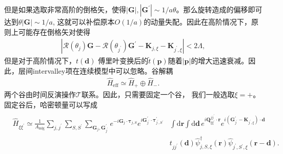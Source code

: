 \documentclass[10pt, oneside]{article}
\begin{document}
但是如果选取非常高阶的倒格矢，使得\(\left|\bm{G}\right|, \left|\bm{G}^{\prime}\right| \sim 1/a \theta\)。那么旋转造成的偏移即可达到\(\theta \left|\bm{G}\right| \sim 1/a\), 这就可以补偿原本\(O \left(1/a\right)\)的动量失配。因此在高阶情况下，原则上可能存在倒格矢对使得
\begin{align}
	\left|\mathcal{R}\left(\theta_{j}\right) \bm{G} - \mathcal{R} \left(\theta_{j^{\prime}}\right) \bm{G}^{\prime} - \bm{K}_{j,\xi} - \bm{K}_{j^{\prime},\xi}\right| < 2 \Lambda,
\end{align}
但是对于高阶情况下，\(t \left(\bm{d}\right)\) 傅里叶变换后的\(\tilde{t }\left(\bm{p }\right)\)随着\(\left|\bm{p }\right|\)的增大迅速衰减。因此，层间intervalley项在连续模型中可以忽略。谷解耦
\begin{align}
	\hat{H }_{\mathrm{eff}} \simeq \hat{H }_{+} \oplus \hat{H }_{-}.
\end{align}
两个谷由时间反演操作\(\mathcal{T }\)联系。因此，只需要固定一个谷， 我们一般选取\(\xi = +\)。固定谷后，哈密顿量可以写成
\begin{align}
	\begin{split}
		\boxed{
			\begin{aligned}
				\hat{H}_{\xi \xi^{\prime}} \simeq \frac{1}{A_{\mathrm{mlg}}} \sum_{j,j^{\prime}} \sum_{S,S^{\prime}} \sum_{\bm{G}_{j}, \bm{G}^{\prime}_{j^{\prime}}} e^{-i \bm{G}_{j} \cdot \bm{\tau}_{j,S}} e^{i \bm{G}^{\prime}_{j^{\prime}} \cdot \bm{\tau}^{\prime}_{j^{\prime}, S^{\prime}}} & \int \mathrm{d} \bm{r} \int \mathrm{d} \bm{d} \, e^{i \bm{Q}_{\xi \xi^{\prime}}^{j j^{\prime}}  \cdot \bm{r}} e^{i \left(\bm{G}^{\prime}_{j^{\prime}} - \bm{K}_{j^{\prime}, \xi} \right) \cdot \bm{d}} \\
				& t_{jj^{\prime}} \left(\bm{d}\right) \hat{\psi}^{\dagger}_{j,S,\xi} \left(\bm{r}\right) \hat{\psi}_{j^{\prime}, S^{\prime}, \xi} \left(\bm{r} - \bm{d}\right).
			\end{aligned}
		}
	\end{split}
\end{align}
\end{document}
